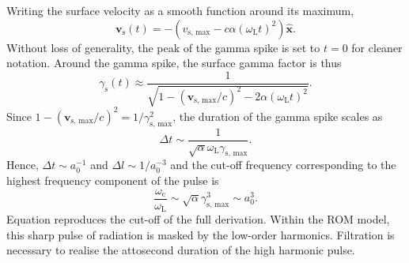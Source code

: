 Writing the surface velocity as a smooth function around its maximum,
\begin{equation}\label{eq:orion-vs}
	\mathbf{v}_\mathrm{s}(t) = -(v_\mathrm{s,\, max} - c\alpha(\omega_\mathrm{L}t)^2) \mathbf{\hat{x}}.
\end{equation}
Without loss of generality, the peak of the gamma spike is set to $t=0$ for cleaner notation. Around the gamma spike, the surface gamma factor is thus
\begin{equation}
	\gamma_\mathrm{s}(t) \approx \frac{1}{\sqrt{1-(\mathbf{v}_\mathrm{s,\, max}/c)^2 - 2\alpha(\omega_\mathrm{L}t)^2}}.
\end{equation}
Since $1-(\mathbf{v}_\mathrm{s,\, max}/c)^2 = 1/\gamma_\mathrm{s,\, max}^2$, the duration of the gamma spike scales as
\begin{equation}
	\Delta t \sim \frac{1}{\sqrt{\alpha }\omega_\mathrm{L} \gamma_\mathrm{s,\, max}}.
\end{equation}
Hence, $\Delta t \sim a_0^{-1}$ and $\Delta l \sim 1/a_0^{-3}$ and the cut-off frequency corresponding to the highest frequency component of the pulse is
\begin{equation}\label{eq:orion-omegac}
	\frac{\omega_\mathrm{c}}{\omega_\mathrm{L}} \sim \sqrt{\alpha}\gamma_\mathrm{s,\, max}^3 \sim a_0^3.
\end{equation}
Equation \label{eq:orion-omegac} reproduces the cut-off of the full derivation. Within the ROM model, this sharp pulse of radiation is masked by the low-order harmonics. Filtration is necessary to realise the attosecond duration of the high harmonic pulse.

